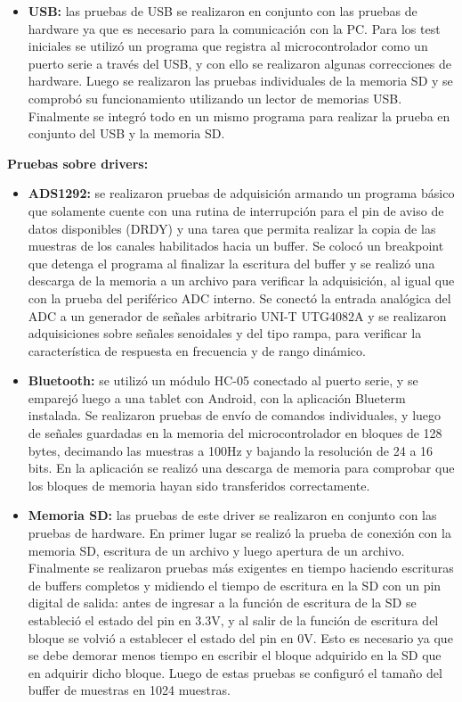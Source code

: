 \begin{itemize}
\item \textbf{USB:} las pruebas de USB se realizaron en conjunto con las pruebas de hardware ya que es necesario para la comunicación con la PC. Para los test iniciales se utilizó un programa que registra al microcontrolador como un puerto serie a través del USB, y con ello se realizaron algunas correcciones de hardware. Luego se realizaron las pruebas individuales de la memoria SD y se comprobó su funcionamiento utilizando un lector de memorias USB. Finalmente se integró todo en un mismo programa para realizar la prueba en conjunto del USB y la memoria SD.

\end{itemize}


\textbf{Pruebas sobre drivers:}


\begin{itemize}

\item \textbf{ADS1292:} se realizaron pruebas de adquisición armando un programa básico que solamente cuente con una rutina de interrupción para el pin de aviso de datos disponibles (DRDY) y una tarea que permita realizar la copia de las muestras de los canales habilitados hacia un buffer. Se colocó un breakpoint que detenga el programa al finalizar la escritura del buffer y se realizó una descarga de la memoria a un archivo para verificar la adquisición, al igual que con la prueba del periférico ADC interno. Se conectó la entrada analógica del ADC a un generador de señales arbitrario UNI-T UTG4082A y se realizaron adquisiciones sobre señales senoidales y del tipo rampa, para verificar la característica de respuesta en frecuencia y de rango dinámico. 

\item \textbf{Bluetooth:} se utilizó un módulo HC-05 conectado al puerto serie, y se emparejó luego a una tablet con Android, con la aplicación Blueterm\citep{pymasde2013} instalada. Se realizaron pruebas de envío de comandos individuales, y luego de señales guardadas en la memoria del microcontrolador en bloques de 128 bytes, decimando las muestras a 100Hz y bajando la resolución de 24 a 16 bits. En la aplicación se realizó una descarga de memoria para comprobar que los bloques de memoria hayan sido transferidos correctamente.

\item \textbf{Memoria SD:} las pruebas de este driver se realizaron en conjunto con las pruebas de hardware. En primer lugar se realizó la prueba de conexión con la memoria SD, escritura de un archivo y luego apertura de un archivo. Finalmente se realizaron pruebas más exigentes en tiempo haciendo escrituras de buffers completos y midiendo el tiempo de escritura en la SD con un pin digital de salida: antes de ingresar a la función de escritura de la SD se estableció el estado del pin en 3.3V, y al salir de la función de escritura del bloque se volvió a establecer el estado del pin en 0V. Esto es necesario ya que se debe demorar menos tiempo en escribir el bloque adquirido en la SD que en adquirir dicho bloque. Luego de estas pruebas se configuró el tamaño del buffer de muestras en 1024 muestras.

\end{itemize}

